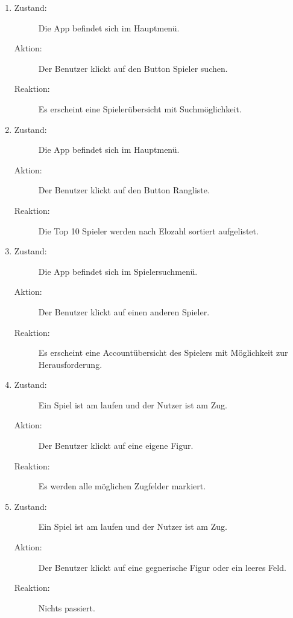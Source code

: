 \documentclass[parskip=full]{scrartcl}
\begin{document}
\begin{enumerate}
	\item
	\begin{description}
	\item[Zustand:] Die App befindet sich im Hauptmenü.
	\item[Aktion:] Der Benutzer klickt auf den Button \glqq Spieler suchen\grqq.
	\item[Reaktion:] Es erscheint eine Spielerübersicht mit Suchmöglichkeit.  \\
	\end{description}
	
	\item
	\begin{description}
	\item[Zustand:] Die App befindet sich im Hauptmenü.
	\item[Aktion:] Der Benutzer klickt auf den Button \glqq Rangliste\grqq.
	\item[Reaktion:] Die Top 10 Spieler werden nach Elozahl sortiert aufgelistet.  \\
	\end{description}
	
	\item
	\begin{description}
	\item[Zustand:] Die App befindet sich im Spielersuchmenü.
	\item[Aktion:] Der Benutzer klickt auf einen anderen Spieler.
	\item[Reaktion:] Es erscheint eine Accountübersicht des Spielers mit Möglichkeit zur Herausforderung.  \\
	\end{description}
	
	\item 
	\begin{description}
	\item[Zustand:] Ein Spiel ist am laufen und der Nutzer ist am Zug.
	\item[Aktion:] Der Benutzer klickt auf eine eigene Figur.
	\item[Reaktion:] Es werden alle möglichen Zugfelder markiert.  \\
	\end{description}
	
	\item 
	\begin{description}
	\item[Zustand:] Ein Spiel ist am laufen und der Nutzer ist am Zug.
	\item[Aktion:] Der Benutzer klickt auf eine gegnerische Figur oder ein leeres Feld.
	\item[Reaktion:] Nichts passiert.  \\
	\end{description}
	

\end{enumerate}
\end{document}

